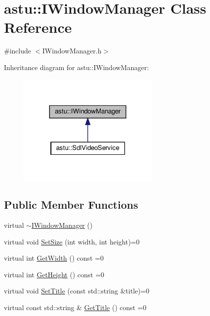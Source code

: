 \hypertarget{classastu_1_1IWindowManager}{}\section{astu\+:\+:I\+Window\+Manager Class Reference}
\label{classastu_1_1IWindowManager}


{\ttfamily \#include $<$I\+Window\+Manager.\+h$>$}



Inheritance diagram for astu\+:\+:I\+Window\+Manager\+:\nopagebreak
\begin{figure}[H]
\begin{center}
\leavevmode
\includegraphics[width=197pt]{classastu_1_1IWindowManager__inherit__graph}
\end{center}
\end{figure}
\subsection*{Public Member Functions}
\begin{DoxyCompactItemize}
\item 
virtual \hyperlink{classastu_1_1IWindowManager_a45f1d28db89ccec4e773aaaf891d9d7b}{$\sim$\+I\+Window\+Manager} ()
\item 
virtual void \hyperlink{classastu_1_1IWindowManager_aca77eeecb7c790fa3c1d58c20dd7294f}{Set\+Size} (int width, int height)=0
\item 
virtual int \hyperlink{classastu_1_1IWindowManager_a6f818a88754bde33c3121e7413d3a554}{Get\+Width} () const =0
\item 
virtual int \hyperlink{classastu_1_1IWindowManager_a80a146779e21437e8c6ef78889389dfc}{Get\+Height} () const =0
\item 
virtual void \hyperlink{classastu_1_1IWindowManager_ae75ef0ce5ff6943712b9aa55cbfaadf8}{Set\+Title} (const std\+::string \&title)=0
\item 
virtual const std\+::string \& \hyperlink{classastu_1_1IWindowManager_aa5733f1ceda60796f6e35f5f7b79ffa9}{Get\+Title} () const =0
\end{DoxyCompactItemize}



